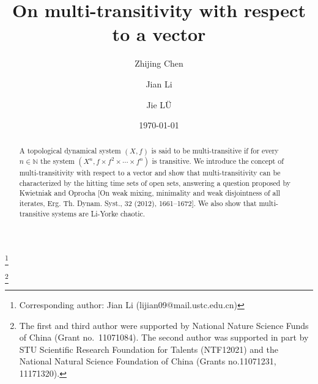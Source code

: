 \documentclass[12pt,a4paper]{amsart}
\theoremstyle{definition}
\numberwithin{equation}{section}
\begin{document}
\title{On multi-transitivity with respect to a vector}

\author[Z.~Chen]{Zhijing Chen}
\address[Z.~Chen]{Department of Mathematics, Zhongshan University, Guangzhou 510275, P. R. China}
\author[J.~Li]{Jian Li}
\thanks{Corresponding author: Jian Li (lijian09@mail.ustc.edu.cn)}
\address[J.~Li]{Department of Mathematics, Shantou University, Shantou, Guangdong 515063, P.R. China}
\author[J.~L\"u]{Jie L\"U}
\address[J.~L\"u]{School of Mathematics, South China Normal University, Guangzhou 510631, P. R. China}

\thanks{The first and third author were supported by National Nature Science Funds of China (Grant  no.~11071084).
The second author was supported in part by STU Scientific Research Foundation for Talents (NTF12021) and
the National Natural Science Foundation of China (Grants no.\@11071231, 11171320).}
\date{\today}

\begin{abstract}
A topological dynamical system $(X,f)$ is said to be multi-transitive
if for every $n\in\mathbb{N}$ the system $(X^{n}, f\times f^{2}\times \dotsb\times f^{n})$ is transitive.
We introduce the concept of multi-transitivity with respect to a vector and show that
multi-transitivity can be characterized by the hitting time sets of  open sets,
answering a question proposed by  Kwietniak and Oprocha [On weak mixing, minimality and weak  disjointness of
all iterates,  Erg. Th. Dynam. Syst., 32 (2012), 1661--1672].
We also show that multi-transitive systems are  Li-Yorke chaotic.
\end{abstract}
\maketitle
\end{document}
